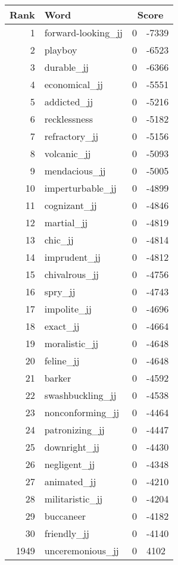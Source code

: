 \begin{longtable}[!htbp]{| rlr@{.}l |}
    \hline
    \textbf{Rank} & \textbf{Word} & \multicolumn{2}{c|}{\textbf{Score}} \\
    \hline
    \endhead
    1 & forward-looking\_jj & 0 & -7339 \\
    2 & playboy & 0 & -6523 \\
    3 & durable\_jj & 0 & -6366 \\
    4 & economical\_jj & 0 & -5551 \\
    5 & addicted\_jj & 0 & -5216 \\
    6 & recklessness & 0 & -5182 \\
    7 & refractory\_jj & 0 & -5156 \\
    8 & volcanic\_jj & 0 & -5093 \\
    9 & mendacious\_jj & 0 & -5005 \\
    10 & imperturbable\_jj & 0 & -4899 \\
    11 & cognizant\_jj & 0 & -4846 \\
    12 & martial\_jj & 0 & -4819 \\
    13 & chic\_jj & 0 & -4814 \\
    14 & imprudent\_jj & 0 & -4812 \\
    15 & chivalrous\_jj & 0 & -4756 \\
    16 & spry\_jj & 0 & -4743 \\
    17 & impolite\_jj & 0 & -4696 \\
    18 & exact\_jj & 0 & -4664 \\
    19 & moralistic\_jj & 0 & -4648 \\
    20 & feline\_jj & 0 & -4648 \\
    21 & barker & 0 & -4592 \\
    22 & swashbuckling\_jj & 0 & -4538 \\
    23 & nonconforming\_jj & 0 & -4464 \\
    24 & patronizing\_jj & 0 & -4447 \\
    25 & downright\_jj & 0 & -4430 \\
    26 & negligent\_jj & 0 & -4348 \\
    27 & animated\_jj & 0 & -4210 \\
    28 & militaristic\_jj & 0 & -4204 \\
    29 & buccaneer & 0 & -4182 \\
    30 & friendly\_jj & 0 & -4140 \\
    1949 & unceremonious\_jj & 0 & 4102 \\

\end{longtable}
